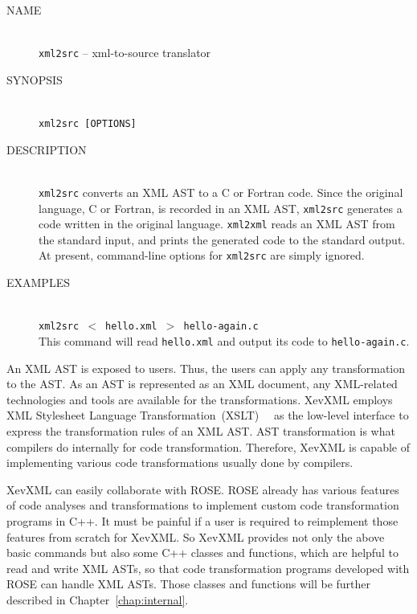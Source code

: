 \begin{framed}
\begin{description}
 \item[NAME]~\\
	    \texttt{xml2src} -- xml-to-source translator

 \item[SYNOPSIS]~\\
	    \texttt{xml2src [OPTIONS]}

 \item[DESCRIPTION]~\\ \texttt{xml2src} converts an XML AST to a C or
	    Fortran code. Since the original language, C or Fortran, is
	    recorded in an XML AST, \texttt{xml2src} generates a code
	    written in the original language. \texttt{xml2xml} reads an
	    XML AST from the standard input, and prints the generated
	    code to the standard output. At present, command-line
	    options for \texttt{xml2src} are simply ignored.

 \item[EXAMPLES]~\\ \texttt{xml2src $<$ hello.xml $>$ hello-again.c}\\
	    This command will read \texttt{hello.xml} and output its
	    code to \texttt{hello-again.c}.
\end{description}
\end{framed}

An XML AST is exposed to users. Thus, the users can apply any
transformation to the AST. As an AST is represented as an XML
document, any XML-related technologies and tools are available for the
transformations. XevXML employs XML Stylesheet Language
Transformation~(XSLT)~\cite{Kay08xslt}~\cite{Tidwell08xslt} as the
low-level interface to express the transformation rules of an XML AST.
AST transformation is what compilers do internally for code
transformation. Therefore, XevXML is capable of implementing various
code transformations usually done by compilers.

XevXML can easily collaborate with ROSE.  ROSE already has various
features of code analyses and transformations to implement custom code
transformation programs in C++.  It must be painful if a user is
required to reimplement those features from scratch for XevXML. So
XevXML provides not only the above basic commands but also some C++
classes and functions, which are helpful to read and write XML ASTs, so
that code transformation programs developed with ROSE can handle XML
ASTs. Those classes and functions will be further described in
Chapter~\ref{chap:internal}.

